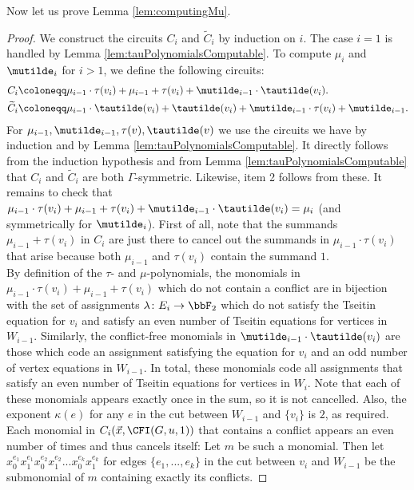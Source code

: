 \documentclass[a4paper,UKenglish,cleveref, autoref, thm-restate]{lipics-v2021}
\begin{document}
Now let us prove Lemma \ref{lem:computingMu}.
\begin{proof}
	We construct the circuits $C_i$ and 
	$\widetilde{C}_i$ by induction on $i$.
	The case $i = 1$ is handled by Lemma \ref{lem:tauPolynomialsComputable}.
	To compute $\mu_i$ and $\mutilde_i$ for $i > 1$, we define the following circuits:
	\begin{align*}
		C_i &\coloneqq \mu_{i-1} \cdot \tau(v_i) + \mu_{i-1} + \tau(v_i)  + \mutilde_{i-1} \cdot \tautilde(v_i).\\
		\widetilde{C}_i &\coloneqq \mu_{i-1} \cdot \tautilde(v_i) +  \tautilde(v_i) + \mutilde_{i-1} \cdot \tau(v_i) + \mutilde_{i-1}.
	\end{align*}	
	For $\mu_{i-1}, \mutilde_{i-1}, \tau(v), \tautilde(v)$ we use the circuits we have by induction and by Lemma \ref{lem:tauPolynomialsComputable}.
	It directly follows from the induction hypothesis and from Lemma \ref{lem:tauPolynomialsComputable} that $C_i$ and $\widetilde{C}_i$ are both $\Gamma$-symmetric. Likewise, item 2 follows from these. It remains to check that $\mu_{i-1} \cdot \tau(v_i) + \mu_{i-1} + \tau(v_i) + \mutilde_{i-1} \cdot \tautilde(v_i) = \mu_i$ (and symmetrically for $\mutilde_i$). First of all, note that the summands $\mu_{i-1} + \tau(v_i)$ in $C_i$ are just there to cancel out the summands in $\mu_{i-1} \cdot \tau(v_i)$ that arise because both $\mu_{i-1}$ and $\tau(v_i)$ contain the summand $1$.\\
	By definition of the $\tau$- and $\mu$-polynomials, the monomials in $\mu_{i-1} \cdot \tau(v_i) + \mu_{i-1} + \tau(v_i)$ which do not contain a conflict are in bijection with the set of assignments $\lambda\colon E_i \to \bbF_2$ which do not satisfy the Tseitin equation for $v_i$ and satisfy an even number of Tseitin equations for vertices in $W_{i-1}$. Similarly, the conflict-free monomials in $\mutilde_{i-1} \cdot \tautilde(v_i)$ are those which code an assignment satisfying the equation for $v_i$ and an odd number of vertex equations in $W_{i-1}$. In total, these monomials code all assignments that satisfy an even number of Tseitin  equations for vertices in $W_i$. Note that each of these monomials appears exactly once in the sum, so it is not cancelled. Also, the exponent $\kappa(e)$ for any $e$ in the cut between $W_{i-1}$ and $\{v_i\}$ is $2$, as required. Each monomial in $C_i(\vec x, \CFI(G, u, 1))$ that contains a conflict appears an even number of times and thus cancels itself: Let $m$ be such a monomial. Then let $x_0^{e_1}x_1^{e_1}x_0^{e_2}x_1^{e_2}...x_0^{e_k}x_1^{e_k}$ for edges $\{e_1,...,e_k\}$ in the cut between $v_i$ and $W_{i-1}$ be the submonomial of $m$ containing exactly its conflicts.

\end{proof}
\end{document}
